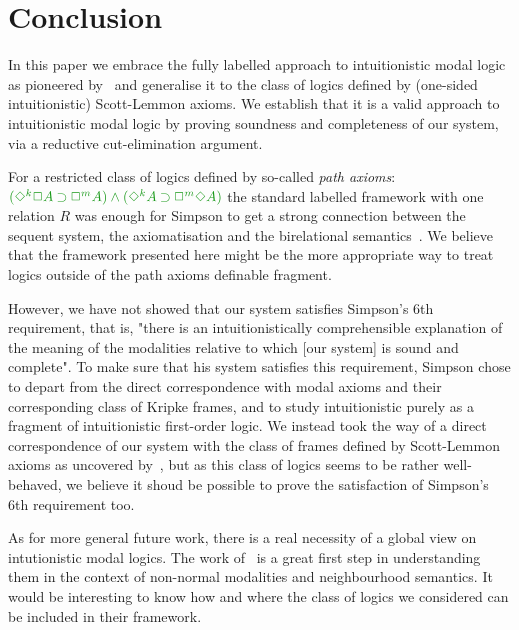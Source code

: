 \section{Conclusion}

In this paper we embrace the fully labelled approach to intuitionistic modal logic as pioneered by~\cite{maffezioli:etal:synthese13} and generalise it to the class of logics defined by (one-sided intuitionistic) Scott-Lemmon axioms.
%
We establish that it is a valid approach to intuitionistic modal logic by proving soundness and completeness of our system, via a reductive cut-elimination argument.

For a restricted class of logics defined by so-called \emph{path axioms}: $\fm{(\DIA^k\BOX A \IMP\BOX^m A) \AND (\DIA^k A \IMP \BOX^m\DIA A)}$ the standard labelled framework with one relation $R$ was enough for Simpson to get a strong connection between the sequent system, the axiomatisation and the birelational semantics~\cite{simpson:phd}.
%
%
We believe that the framework presented here might be the more appropriate way to treat logics outside of the path axioms definable fragment.

However, we have not showed that our system satisfies Simpson's 6th requirement, that is, "there is an intuitionistically comprehensible explanation of the meaning of the modalities relative to which [our system] is sound and complete".
%
To make sure that his system satisfies this requirement, Simpson chose to depart from the direct correspondence with modal axioms and their corresponding class of Kripke frames, and to study intuitionistic purely as a fragment of intuitionistic first-order logic.
%
We instead took the way of a direct correspondence of our system with the class of frames defined by Scott-Lemmon axioms as uncovered by~\cite{plotkin:stirling:86}, but as this class of logics seems to be rather well-behaved, we believe it shoud be possible to prove the satisfaction of Simpson's 6th requirement too.

As for more general future work, there is a real necessity of a global view on intutionistic modal logics.
%
The work of~\cite{dalmonte:grellois:olivetti:arxiv19} is a great first step in understanding them in the context of non-normal modalities and neighbourhood semantics.
%
It would be interesting to know how and where the class of logics we considered can be included in their framework.
